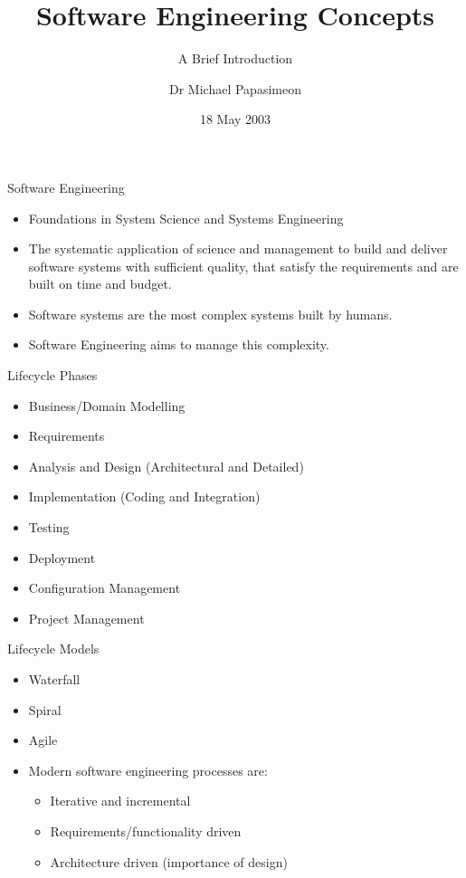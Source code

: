 \documentclass[aspectratio=1610,xcolor=dvipsnames,t,compress]{beamer}
\title[Software Engineering]{Software Engineering Concepts}
\subtitle{A Brief Introduction}
\author[Michael Papasimeon]{Dr Michael Papasimeon}
\date{18 May 2003}
\begin{document}
\begin{frame}
    \maketitle
\end{frame} 

\begin{frame}{Software Engineering}
    \begin{itemize}
        \item Foundations in System Science and Systems Engineering
        \item The systematic application of science and management to 
              build and deliver software systems with sufficient 
              quality, that satisfy the requirements and are 
              built on time and budget.
        \item Software systems are the most complex systems built by humans. 
        \item Software Engineering aims to manage this complexity.
    \end{itemize}
\end{frame}

\begin{frame}{Lifecycle Phases}
    \begin{itemize}
        \item Business/Domain Modelling 
        \item Requirements
        \item Analysis and Design (Architectural and Detailed)
        \item Implementation (Coding and Integration)
        \item Testing
        \item Deployment
        \item Configuration Management
        \item Project Management
    \end{itemize}
\end{frame}

\begin{frame}{Lifecycle Models}
    \begin{itemize}
        \item Waterfall
        \item Spiral
        \item Agile
        \item Modern software engineering processes are:
            \begin{itemize}
                \item Iterative and incremental
                \item Requirements/functionality driven
                \item Architecture driven (importance of design)
            \end{itemize}
    \end{itemize}
\end{frame} 
\end{document}
